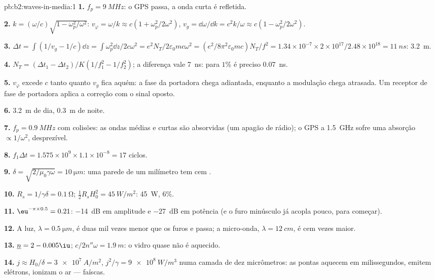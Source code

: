 \begin{solution}{pb:b2:waves-in-media:1}
\textbf{1.} $f_p = \qty{9}{MHz}$: o GPS passa, a onda curta é refletida.

\textbf{2.} $k = (\omega/c)\sqrt{1 - \omega_p^2/\omega^2}$: $v_\varphi = \omega/k \approx c(1 + \omega_p^2/
2\omega^2)$, $v_g = \dd\omega/\dd k = c^2k/\omega \approx c(1 - \omega_p^2/2\omega^2)$.

\textbf{3.} $\Delta t = \int(1/v_g - 1/c)\dd z = \int\omega_p^2\dd z/2c\omega^2 = e^2N_T/2\varepsilon_0
mc\omega^2 = (e^2/8\pi^2\varepsilon_0mc)N_T/f^2 = 1.34 \times 10^{-7} \times 2 \times 10^{17}/2.48 \times
10^{18} = \qty{11}{ns}$: \qty{3.2}{m}.

\textbf{4.} $N_T = (\Delta t_1 - \Delta t_2)/K(1/f_1^2 - 1/f_2^2)$; a diferença vale
\qty{7}{ns}: para $1\%$ é preciso \qty{0.07}{ns}.

\textbf{5.} $v_\varphi$ excede $c$ tanto quanto $v_g$ fica aquém: a
fase da portadora chega adiantada, enquanto a modulação chega atrasada. Um
receptor de fase de portadora aplica a correção com o sinal oposto.

\textbf{6.} \qty{3.2}{m} de dia, \qty{0.3}{m} de noite.

\textbf{7.} $f_p = \qty{0.9}{MHz}$ com colisões: as ondas médias e curtas são
absorvidas (um apagão de rádio); o GPS a \qty{1.5}{GHz} sofre uma absorção
$\propto 1/\omega^2$, desprezível.

\textbf{8.} $f_1\Delta t = 1.575 \times 10^9 \times 1.1 \times 10^{-8} = 17$ ciclos.

\textbf{9.} $\delta = \sqrt{2/\mu_0\gamma\omega} = \qty{10}{\micro m}$: uma parede de um milímetro tem
cem .

\textbf{10.} $R_s = 1/\gamma\delta = \qty{0.1}{\ohm}$; $\tfrac12R_sH_0^2 = \qty{45}{W/m^2}$: \qty{45}{W},
$6\%$.

\textbf{11.} $\eu^{-\pi \times 0.5} = 0.21$: \qty{-14}{dB} em amplitude e \qty{-27}{dB} em
potência (e o furo minúsculo já acopla pouco, para começar).

\textbf{12.} A luz, $\lambda = \qty{0.5}{\micro m}$, é duas mil vezes menor
que os furos e passa; a micro-onda, $\lambda = \qty{12}{cm}$, é
cem vezes maior.

\textbf{13.} $\underline n = 2 - 0.005\iu$; $c/2n''\omega = \qty{1.9}{m}$: o vidro quase
não é aquecido.

\textbf{14.} $j \approx H_0/\delta = \qty{3e7}{A/m^2}$, $j^2/\gamma = \qty{9e8}{W/m^3}$ numa
camada de dez micrômetros: as pontas aquecem em milissegundos, emitem elétrons,
ionizam o ar --- faíscas.


\end{solution}
